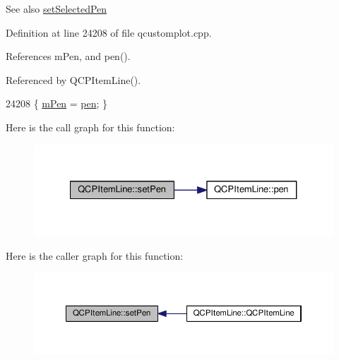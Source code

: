 \begin{DoxySeeAlso}{See also}
\hyperlink{class_q_c_p_item_line_a3e2fec44503277e77717e9c24f87f1ea}{set\+Selected\+Pen} 
\end{DoxySeeAlso}


Definition at line 24208 of file qcustomplot.\+cpp.



References m\+Pen, and pen().



Referenced by Q\+C\+P\+Item\+Line().


\begin{DoxyCode}
24208 \{ \hyperlink{class_q_c_p_item_line_abbb544d5bb927dfe4e81a7f3ca4c65ac}{mPen} = \hyperlink{class_q_c_p_item_line_a235779dd079a263bedb20b3daecc40eb}{pen}; \}
\end{DoxyCode}


Here is the call graph for this function\+:\nopagebreak
\begin{figure}[H]
\begin{center}
\leavevmode
\includegraphics[width=327pt]{class_q_c_p_item_line_a572528dab61c1abe205822fbd5db4b27_cgraph}
\end{center}
\end{figure}




Here is the caller graph for this function\+:\nopagebreak
\begin{figure}[H]
\begin{center}
\leavevmode
\includegraphics[width=350pt]{class_q_c_p_item_line_a572528dab61c1abe205822fbd5db4b27_icgraph}
\end{center}
\end{figure}


\hypertarget{class_q_c_p_item_line_a3e2fec44503277e77717e9c24f87f1ea}{}
